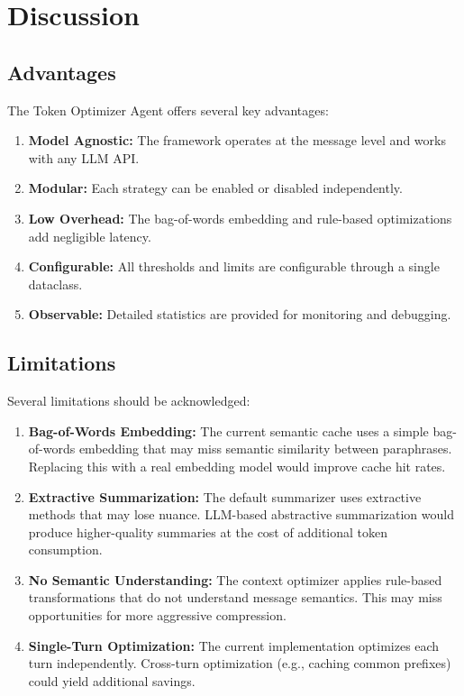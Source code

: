 \section{Discussion}
\label{sec:discussion}

\subsection{Advantages}

The Token Optimizer Agent offers several key advantages:

\begin{enumerate}[leftmargin=*]
    \item \textbf{Model Agnostic:} The framework operates at the message level and works with any LLM API.
    \item \textbf{Modular:} Each strategy can be enabled or disabled independently.
    \item \textbf{Low Overhead:} The bag-of-words embedding and rule-based optimizations add negligible latency.
    \item \textbf{Configurable:} All thresholds and limits are configurable through a single dataclass.
    \item \textbf{Observable:} Detailed statistics are provided for monitoring and debugging.
\end{enumerate}

\subsection{Limitations}

Several limitations should be acknowledged:

\begin{enumerate}[leftmargin=*]
    \item \textbf{Bag-of-Words Embedding:} The current semantic cache uses a simple bag-of-words embedding that may miss semantic similarity between paraphrases. Replacing this with a real embedding model would improve cache hit rates.
    \item \textbf{Extractive Summarization:} The default summarizer uses extractive methods that may lose nuance. LLM-based abstractive summarization would produce higher-quality summaries at the cost of additional token consumption.
    \item \textbf{No Semantic Understanding:} The context optimizer applies rule-based transformations that do not understand message semantics. This may miss opportunities for more aggressive compression.
    \item \textbf{Single-Turn Optimization:} The current implementation optimizes each turn independently. Cross-turn optimization (e.g., caching common prefixes) could yield additional savings.
\end{enumerate}

